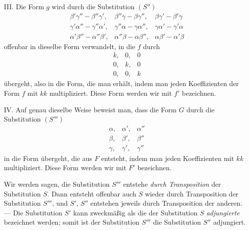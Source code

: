 III. Die Form $g$ wird durch die Substitution $(S'')$
\[
\begin{array}{ccc}
\beta'\gamma''-\beta''\gamma', & \beta''\gamma-\beta\gamma'', & \beta\gamma'-\beta'\gamma \\
\gamma'\alpha''-\gamma''\alpha', & \gamma''\alpha-\gamma\alpha'', & \gamma\alpha'-\gamma'\alpha \\
\alpha'\beta''-\alpha''\beta', & \alpha''\beta-\alpha\beta'', & \alpha\beta'-\alpha'\beta
\end{array}
\]
offenbar in dieselbe Form verwandelt, in die $f$ durch
\[
\begin{array}{ccc}
k, & 0, & 0 \\
0, & k, & 0 \\
0, & 0, & k
\end{array}
\]
übergeht, also in die Form, die man erhält, indem man jeden Koeffizienten der Form $f$ mit $kk$ multipliziert. Diese Form werden wir mit $f'$ bezeichnen.

IV. Auf genau dieselbe Weise beweist man, dass die Form $G$ durch die Substitution $(S''')$
\[
\begin{array}{ccc}
\alpha, & \alpha', & \alpha'' \\
\beta, & \beta', & \beta'' \\
\gamma, & \gamma', & \gamma''
\end{array}
\]
in die Form übergeht, die aus $F$ entsteht, indem man jeden Koeffizienten mit $kk$ multipliziert. Diese Form werden wir mit $F'$ bezeichnen.

Wir werden sagen, die Substitution $S'''$ entstehe \textit{durch Transposition} der Substitution $S$. Dann entsteht offenbar auch $S$ wieder durch Transposition der Substitution $S'''$, und $S'$, $S''$ entstehen jeweils durch Transposition der anderen. --- Die Substitution $S'$ kann zweckmäßig als die der Substitution $S$ \textit{adjungierte} bezeichnet werden; somit ist der Substitution $S'''$ die Substitution $S''$ adjungiert.

